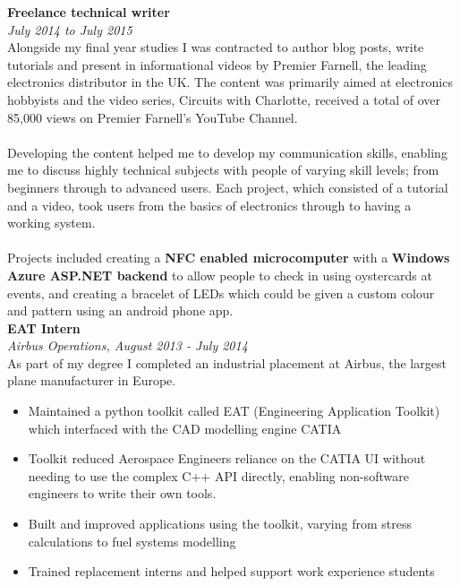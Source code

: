 \documentclass{article}
\begin{document}
\begin{flushleft}
\textbf{Freelance technical writer}\\
\textit{July 2014 to July 2015}\\[5pt]
Alongside my final year studies I was contracted to author blog posts, write tutorials and present in informational videos by Premier Farnell, the leading electronics distributor in the UK. The content was primarily aimed at electronics hobbyists and the video series, Circuits with Charlotte, received a total of over 85,000 views on Premier Farnell's YouTube Channel.

\paragraph{}Developing the content helped me to develop my communication skills, enabling me to discuss highly technical subjects with people of varying skill levels; from beginners through to advanced users. Each project, which consisted of a tutorial and a video, took users from the basics of electronics through to having a working system.

\paragraph{}Projects included creating a \textbf{NFC enabled microcomputer} with a \textbf{Windows Azure ASP.NET backend} to allow people to check in using oystercards at events, and creating a bracelet of LEDs which could be given a custom colour and pattern using an android phone app. \\[10pt]

\textbf{EAT Intern}\\
\textit{Airbus Operations, August 2013 - July 2014}\\[5pt]
As part of my degree I completed an industrial placement at Airbus, the largest plane manufacturer in Europe. 

\begin{itemize}
\item Maintained a python toolkit called EAT (Engineering Application Toolkit) which interfaced with the CAD modelling engine CATIA
\item Toolkit reduced Aerospace Engineers reliance on the CATIA UI without needing to use the complex C++ API directly, enabling non-software engineers to write their own tools.
\item Built and improved applications using the toolkit, varying from stress calculations to fuel systems modelling	
\item Trained replacement interns and helped support work experience students
\end{itemize}


\end{flushleft}
\end{document}
